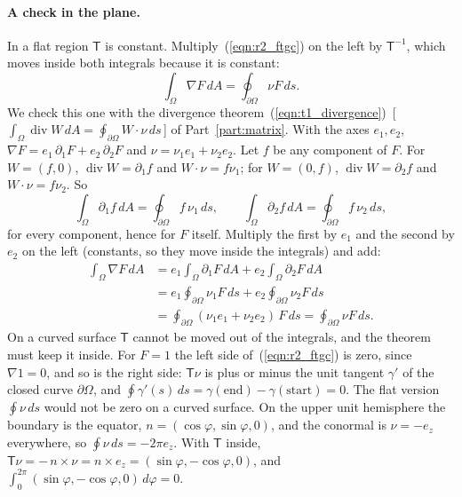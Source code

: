 \paragraph{A check in the plane.} In a flat region $\mathsf T$ is constant. Multiply~(\ref{eqn:r2_ftgc}) on the left by $\mathsf T^{-1}$, which moves inside both integrals because it is constant:
\begin{equation*}
\int_\Omega \nabla F\, dA = \oint_{\partial\Omega} \nu F\, ds .
\end{equation*}
We check this one with the divergence theorem~(\ref{eqn:t1_divergence})~[\,$\int_\Omega\operatorname{div}W\,dA = \oint_{\partial\Omega}W\cdot\nu\,ds$\,] of Part~\ref{part:matrix}. With the axes $e_1, e_2$, $\nabla F = e_1\,\partial_1 F + e_2\,\partial_2 F$ and $\nu = \nu_1 e_1 + \nu_2 e_2$. Let $f$ be any component of $F$. For $W = (f, 0)$, $\operatorname{div}W = \partial_1 f$ and $W\cdot\nu = f\nu_1$; for $W = (0, f)$, $\operatorname{div}W = \partial_2 f$ and $W\cdot\nu = f\nu_2$. So
\begin{equation*}
\int_\Omega \partial_1 f\, dA = \oint_{\partial\Omega} f\,\nu_1\, ds, \qquad \int_\Omega \partial_2 f\, dA = \oint_{\partial\Omega} f\,\nu_2\, ds ,
\end{equation*}
for every component, hence for $F$ itself. Multiply the first by $e_1$ and the second by $e_2$ on the left (constants, so they move inside the integrals) and add:
\begin{align*}
\int_\Omega \nabla F\, dA &= e_1\int_\Omega \partial_1 F\, dA + e_2\int_\Omega \partial_2 F\, dA \\
&= e_1\oint_{\partial\Omega} \nu_1 F\, ds + e_2\oint_{\partial\Omega} \nu_2 F\, ds \\
&= \oint_{\partial\Omega} (\nu_1e_1 + \nu_2e_2)\, F\, ds = \oint_{\partial\Omega}\nu F\, ds .
\end{align*}
On a curved surface $\mathsf T$ cannot be moved out of the integrals, and the theorem must keep it inside. For $F = 1$ the left side of~(\ref{eqn:r2_ftgc}) is zero, since $\nabla 1 = 0$, and so is the right side: $\mathsf T\nu$ is plus or minus the unit tangent $\gamma'$ of the closed curve $\partial\Omega$, and $\oint\gamma'(s)\, ds = \gamma(\text{end}) - \gamma(\text{start}) = 0$. The flat version $\oint\nu\, ds$ would not be zero on a curved surface. On the upper unit hemisphere the boundary is the equator, $n = (\cos\varphi, \sin\varphi, 0)$, and the conormal is $\nu = -e_z$ everywhere, so $\oint\nu\, ds = -2\pi e_z$. With $\mathsf T$ inside, $\mathsf T\nu = -\,n\times\nu = n\times e_z = (\sin\varphi, -\cos\varphi, 0)$, and $\int_0^{2\pi}(\sin\varphi, -\cos\varphi, 0)\, d\varphi = 0$.

